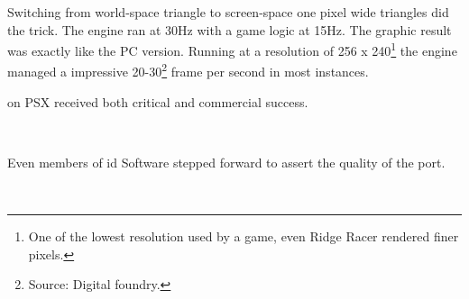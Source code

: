 Switching from world-space triangle to screen-space one pixel wide triangles did the trick. The engine ran at 30Hz with a game logic at 15Hz. The graphic result was exactly like the PC version. Running at a resolution of 256 x 240\footnote{One of the lowest resolution used by a game, even Ridge Racer rendered finer pixels.} the engine managed a impressive 20-30\footnote{Source: Digital foundry.} frame per second in most instances.\\
\par
\doom{} on PSX received both critical and commercial success.\\
\par 
{}\\ 
\par
Even members of id Software stepped forward to assert the quality of the port.\\
\par
{}\\
\par
{}

\pagebreak
